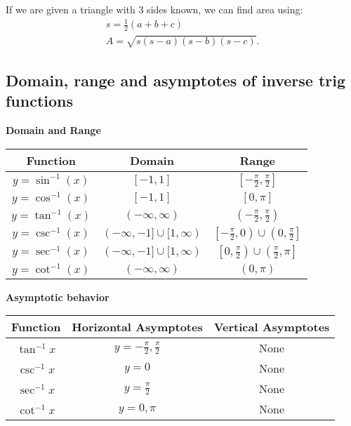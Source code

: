 \documentclass{report}
\begin{document}
  \bigbreak \noindent \bigbreak \noindent
  If we are given a triangle with 3 sides known, we can find area using:
  \begin{align*}
    s = \frac{1}{2}(a+b+c) \\
    A = \sqrt{s(s-a)(s-b)(s-c)}
  .\end{align*}

  \pagebreak \bigbreak \noindent 
  \subsection{Domain, range and asymptotes of inverse trig functions}
  \bigbreak \noindent 
  \textbf{Domain and Range}
  \bigbreak \noindent 
  \begin{center}
    \begin{tabular}{|c|c|c|}
\hline
Function & Domain & Range \\
\hline
$y = \sin^{-1}(x)$ & $[-1, 1]$ & $\left[-\frac{\pi}{2}, \frac{\pi}{2}\right]$ \\
\hline
$y = \cos^{-1}(x)$ & $[-1, 1]$ & $[0, \pi]$ \\
\hline
$y = \tan^{-1}(x)$ & $(-\infty, \infty)$ & $\left(-\frac{\pi}{2}, \frac{\pi}{2}\right)$ \\
\hline
$y = \csc^{-1}(x)$ & $(-\infty, -1] \cup [1, \infty)$ & $\left[-\frac{\pi}{2}, 0\right) \cup \left(0, \frac{\pi}{2}\right]$ \\
\hline
$y = \sec^{-1}(x)$ & $(-\infty, -1] \cup [1, \infty)$ & $\left[0, \frac{\pi}{2}\right) \cup \left(\frac{\pi}{2}, \pi\right]$ \\
\hline
$y = \cot^{-1}(x)$ & $(-\infty, \infty)$ & $(0, \pi)$ \\
\hline
\end{tabular}
  \end{center}
  \bigbreak \noindent 
  \textbf{Asymptotic behavior}
  \bigbreak \noindent 
  \begin{center}

  \begin{tabular}{|c|c|c|}
\hline
Function & Horizontal Asymptotes  & Vertical Asymptotes \\
\hline
$\tan^{-1}{x}$ & $y=-\frac{\pi}{2},\frac{\pi}{2}$ & None \\
\hline
$\csc^{-1}{x}$ & $y=0$ & None \\
\hline
$\sec^{-1}{x}$ & $y=\frac{\pi}{2}$ & None \\
\hline
$\cot^{-1}{x}$ & $y=0,\pi $ & None \\
\hline
\end{tabular}
  \end{center}
  \bigbreak \noindent 
\end{document}
